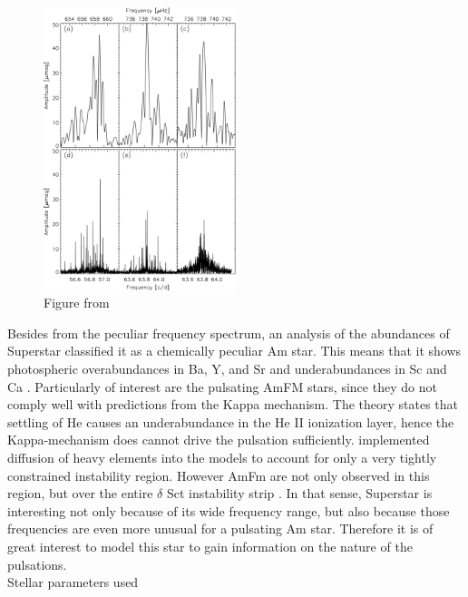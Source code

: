\begin{figure}[htbp]
    \centering
    \includegraphics[width=0.5\textwidth]{superstar2.jpg}
    \caption{Figure from \citet{antoci2014role}}
    \label{ss2}
\end{figure}

Besides from the peculiar frequency spectrum, an analysis of the abundances of Superstar classified it as a chemically peculiar Am star. This means that it shows photospheric overabundances in Ba, Y, and Sr and underabundances in Sc and Ca \citep{preston1974chemically}. Particularly of interest are the pulsating AmFM stars, since they do not comply well with predictions from the Kappa mechanism. The theory states that settling of He causes an underabundance in the He II ionization layer, hence the Kappa-mechanism does cannot drive the pulsation sufficiently. \citet{turcotte2000} implemented diffusion of heavy elements into the models to account for only a very tightly constrained instability region. However AmFm are not only observed in this region, but over the entire $\delta$ Sct instability strip \citep{smalley2011superwasp, balona2011kepler}. In that sense, Superstar is interesting not only because of its wide frequency range, but also because those frequencies are even more unusual for a pulsating Am star. Therefore it is of great interest to model this star to gain information on the nature of the pulsations. 
\\
Stellar parameters used 

